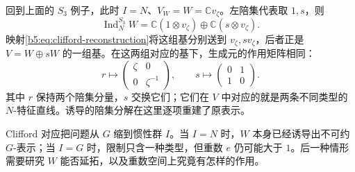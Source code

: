 回到上面的 \(S_3\) 例子，此时 \(I=N\)、\(V_W=W=\mathbb Cv_\zeta\)。左陪集代表取 \(1,s\)，则
\[
	\operatorname{Ind}_N^{S_3}W =\mathbb C(1\otimes v_\zeta)\oplus\mathbb C(s\otimes v_\zeta).
\]
映射\eqref{b5:eq:clifford-reconstruction}将这组基分别送到 \(v_\zeta,sv_\zeta\)，后者正是 \(V=W\oplus sW\) 的一组基。在这两组对应的基下，生成元的作用矩阵相同：
\[
	r\longmapsto\begin{pmatrix}\zeta&0\\0&\zeta^{-1}\end{pmatrix},
	\qquad
	s\longmapsto\begin{pmatrix}0&1\\1&0\end{pmatrix}.
\]
其中 \(r\) 保持两个陪集分量，\(s\) 交换它们；它们在 \(V\) 中对应的就是两条不同类型的 \(N\)-特征直线。诱导的陪集分解在这里逐项重建了原表示。

\ProseParagraphBreak
Clifford 对应把问题从 \(G\) 缩到惯性群 \(I\)。当 \(I=N\) 时，\(W\) 本身已经诱导出不可约 \(G\)-表示；当 \(I=G\) 时，限制只含一种类型，但重数 \(e\) 仍可能大于 \(1\)。后一种情形需要研究 \(W\) 能否延拓，以及重数空间上究竟有怎样的作用。
